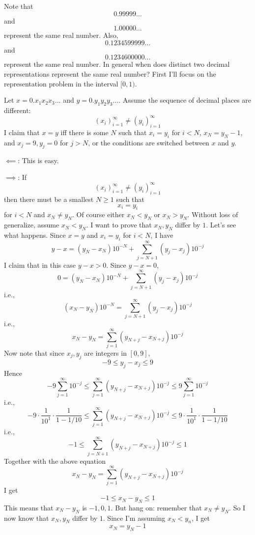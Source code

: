 Note that
\[
0.99999\ldots
\]
and
\[
1.00000\ldots
\]
represent the same real number.
Also,
\[
0.1234599999\ldots
\]
and
\[
0.1234600000\ldots
\]
represent the same real number.
In general when does distinct two decimal representations represent the
same real number?
First I'll focus on the representation problem in the interval $[0,1)$.

Let
$x = 0.x_1x_2x_3...$
and
$y = 0.y_1y_2y_3...$.
Assume the sequence of decimal places are different:
\[
(x_i)_{i=1}^\infty
\neq
(y_i)_{i=1}^\infty
\]
I claim that $x = y$ iff there is some $N$ such that
$x_i = y_i$ for $i < N$,
$x_N = y_N - 1$, and
$x_j = 9, y_j = 0$ for $j > N$, or the conditions are switched between
$x$ and $y$.

$\impliedby$: This is easy.

$\implies$:
If
\[
(x_i)_{i=1}^\infty
\neq
(y_i)_{i=1}^\infty
\]
then there must be a smallest $N \geq 1$ such that
\[
x_i = y_i
\]
for $i < N$
and $x_N \neq y_N$.
Of course either $x_N < y_N$ or $x_N > y_N$.
Without loss of generalize, assume $x_N < y_N$.
I want to prove that $x_N, y_N$ differ by $1$.
Let's see what happens.
Since $x = y$ and $x_i = y_i$ for $i < N$, I have
\[
y - x = (y_N - x_N)10^{-N} + \sum_{j=N+1}^\infty (y_j - x_j)10^{-j}
\]
I claim that in this case $y - x > 0$.
Since $y - x = 0$,
\[
0 = (y_N - x_N)10^{-N} + \sum_{j=N+1}^\infty (y_j - x_j)10^{-j}
\]
i.e.,
\[
(x_N - y_N)10^{-N} = \sum_{j=N+1}^\infty (y_j - x_j)10^{-j}
\]
i.e.,
\[
x_N - y_N = \sum_{j=1}^\infty (y_{N+j} - x_{N+j})10^{-j}
\]
Now note that since $x_j, y_j$ are integers in $[0, 9]$,
\[
-9 \leq y_j - x_j \leq 9
\]
Hence
\[
-9 \sum_{j=1}^\infty 10^{-j} \leq
\sum_{j=1}^\infty (y_{N+j} - x_{N+j})10^{-j} \leq
9 \sum_{j=1}^\infty 10^{-j}
\]
i.e.,
\[
-9 \cdot \frac{1}{10^{1}} \cdot \frac{1}{1 - 1/10}
\leq
\sum_{j=1}^\infty (y_{N+j} - x_{N+j})10^{-j}
\leq
9 \cdot \frac{1}{10^{1}} \cdot \frac{1}{1 - 1/10} 
\]
i.e.,
\[
-1 
\leq
\sum_{j=N+1}^\infty (y_{N+j} - x_{N+j})10^{-j}
\leq
1
\]
Together with the above equation
\[
x_N - y_N = \sum_{j=1}^\infty (y_{N+j} - x_{N+j})10^{-j}
\]
I get
\[
-1 
\leq
x_N - y_N
\leq
1
\]
This means that
$x_N - y_N$
is $-1, 0, 1$.
But hang on: remember that $x_N \neq y_N$.
So I now know that
$x_N,  y_N$ differ by $1$.
Since I'm assuming $x_N < y_n$, I get
\[
x_N = y_N - 1
\]

